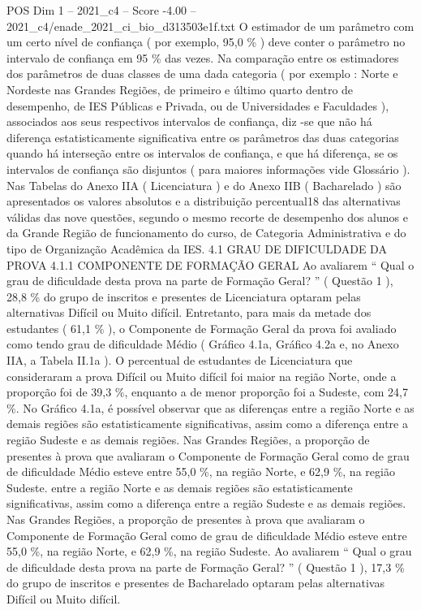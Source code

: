 \begin{textsample}{POS Dim 1 – 2021\_c4 – Score -4.00 – 2021\_c4/enade\_2021\_ci\_bio\_d313503e1f.txt}
O estimador de um parâmetro com um certo nível de confiança ( por exemplo, 95,0 \% ) deve conter o parâmetro no intervalo de confiança em 95 \% das vezes.
Na comparação entre os estimadores dos parâmetros de duas classes de uma dada categoria ( por exemplo : Norte e Nordeste nas Grandes Regiões, de primeiro e último quarto dentro de desempenho, de IES Públicas e Privada, ou de Universidades e Faculdades ), associados aos seus respectivos intervalos de confiança, diz -se que não há diferença estatisticamente significativa entre os parâmetros das duas categorias quando há interseção entre os intervalos de confiança, e que há diferença, se os intervalos de confiança são disjuntos ( para maiores informações vide Glossário ).
Nas Tabelas do Anexo IIA ( Licenciatura ) e do Anexo IIB ( Bacharelado ) são apresentados os valores absolutos e a distribuição percentual18 das alternativas válidas das nove questões, segundo o mesmo recorte de desempenho dos alunos e da Grande Região de funcionamento do curso, de Categoria Administrativa e do tipo de Organização Acadêmica da IES. 4.1 GRAU DE DIFICULDADE DA PROVA 4.1.1 COMPONENTE DE FORMAÇÃO GERAL Ao avaliarem “ Qual o grau de dificuldade desta prova na parte de Formação Geral? ” ( Questão 1 ), 28,8 \% do grupo de inscritos e presentes de Licenciatura optaram pelas alternativas Difícil ou Muito difícil.
Entretanto, para mais da metade dos estudantes ( 61,1 \% ), o Componente de Formação Geral da prova foi avaliado como tendo grau de dificuldade Médio ( Gráfico 4.1a, Gráfico 4.2a e, no Anexo IIA, a Tabela II.1a ).
O percentual de estudantes de Licenciatura que consideraram a prova Difícil ou Muito difícil foi maior na região Norte, onde a proporção foi de 39,3 \%, enquanto a de menor proporção foi a Sudeste, com 24,7 \%.
No Gráfico 4.1a, é possível observar que as diferenças entre a região Norte e as demais regiões são estatisticamente significativas, assim como a diferença entre a região Sudeste e as demais regiões.
Nas Grandes Regiões, a proporção de presentes à prova que avaliaram o Componente de Formação Geral como de grau de dificuldade Médio esteve entre 55,0 \%, na região Norte, e 62,9 \%, na região Sudeste. entre a região Norte e as demais regiões são estatisticamente significativas, assim como a diferença entre a região Sudeste e as demais regiões.
Nas Grandes Regiões, a proporção de presentes à prova que avaliaram o Componente de Formação Geral como de grau de dificuldade Médio esteve entre 55,0 \%, na região Norte, e 62,9 \%, na região Sudeste.
Ao avaliarem “ Qual o grau de dificuldade desta prova na parte de Formação Geral? ” ( Questão 1 ), 17,3 \% do grupo de inscritos e presentes de Bacharelado optaram pelas alternativas Difícil ou Muito difícil.

\end{textsample}
